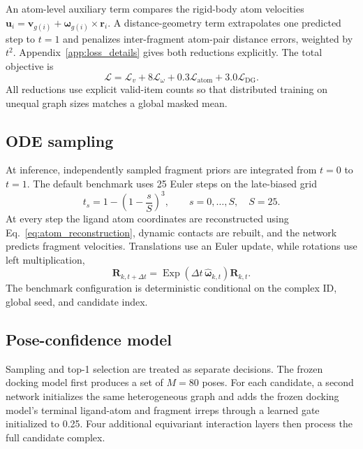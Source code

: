 An atom-level auxiliary term compares the rigid-body atom velocities
\(\mathbf{u}_i=\mathbf{v}_{g(i)}
+\boldsymbol{\omega}_{g(i)}\times\mathbf{r}_i\).
A distance-geometry term extrapolates one predicted step to \(t=1\) and
penalizes inter-fragment atom-pair distance errors, weighted by \(t^2\).
Appendix~\ref{app:loss_details} gives both reductions explicitly. The total
objective is
\begin{equation}
    \mathcal{L}
    =
    \mathcal{L}_{v}
    +8\mathcal{L}_{\omega}
    +0.3\mathcal{L}_{\mathrm{atom}}
    +3.0\mathcal{L}_{\mathrm{DG}}.
    \label{eq:total_loss}
\end{equation}
All reductions use explicit valid-item counts so that distributed training on
unequal graph sizes matches a global masked mean.

\subsection{ODE sampling}
\label{sec:sampling}

At inference, independently sampled fragment priors are integrated from
\(t=0\) to \(t=1\). The default benchmark uses 25 Euler steps on the
late-biased grid
\begin{equation}
    t_s
    =
    1-\left(1-\frac{s}{S}\right)^3,
    \qquad s=0,\ldots,S,\quad S=25.
\end{equation}
At every step the ligand atom coordinates are reconstructed using
Eq.~\eqref{eq:atom_reconstruction}, dynamic contacts are rebuilt, and the
network predicts fragment velocities. Translations use an Euler update, while
rotations use left multiplication,
\[
    \mathbf{R}_{k,t+\Delta t}
    =
    \operatorname{Exp}
    \left(\Delta t\,
    \widehat{\boldsymbol{\omega}}_{k,t}\right)
    \mathbf{R}_{k,t}.
\]
The benchmark configuration is deterministic conditional on the complex ID,
global seed, and candidate index.

\subsection{Pose-confidence model}
\label{sec:confidence}

Sampling and top-1 selection are treated as separate decisions. The frozen
docking model first produces a set of \(M=80\) poses. For each candidate, a
second network initializes the same heterogeneous graph and adds the frozen
docking model's terminal ligand-atom and fragment irreps through a learned
gate initialized to 0.25. Four additional equivariant interaction layers then
process the full candidate complex.

